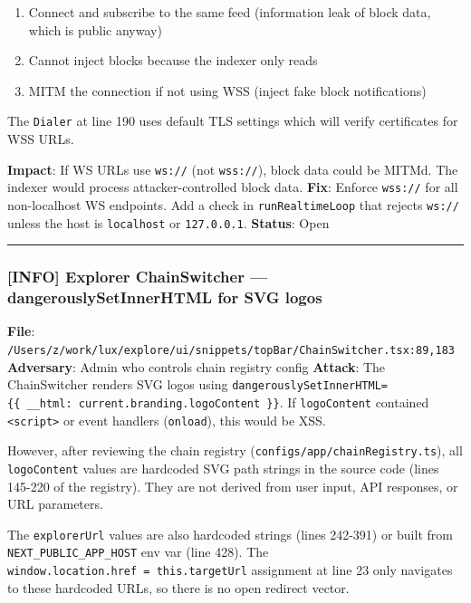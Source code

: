 \documentclass[
]{article}
\providecommand{\tightlist}{%
  \setlength{\itemsep}{0pt}\setlength{\parskip}{0pt}}
\begin{document}
\begin{enumerate}
\def\labelenumi{\arabic{enumi}.}
\tightlist
\item
  Connect and subscribe to the same feed (information leak of block
  data, which is public anyway)
\item
  Cannot inject blocks because the indexer only reads
\item
  MITM the connection if not using WSS (inject fake block notifications)
\end{enumerate}

The \texttt{Dialer} at line 190 uses default TLS settings which will
verify certificates for WSS URLs.

\textbf{Impact}: If WS URLs use \texttt{ws://} (not \texttt{wss://}),
block data could be MITM\textquotesingle d. The indexer would process
attacker-controlled block data. \textbf{Fix}: Enforce \texttt{wss://}
for all non-localhost WS endpoints. Add a check in
\texttt{runRealtimeLoop} that rejects \texttt{ws://} unless the host is
\texttt{localhost} or \texttt{127.0.0.1}. \textbf{Status}: Open

\begin{center}\rule{0.5\linewidth}{0.5pt}\end{center}

\subsubsection{{[}INFO{]} Explorer ChainSwitcher ---
dangerouslySetInnerHTML for SVG
logos}\label{info-explorer-chainswitcher--dangerouslysetinnerhtml-for-svg-logos}

\textbf{File}:
\texttt{/Users/z/work/lux/explore/ui/snippets/topBar/ChainSwitcher.tsx:89,183}
\textbf{Adversary}: Admin who controls chain registry config
\textbf{Attack}: The ChainSwitcher renders SVG logos using
\texttt{dangerouslySetInnerHTML=\{\{\ \_\_html:\ current.branding.logoContent\ \}\}}.
If \texttt{logoContent} contained
\texttt{\textless{}script\textgreater{}} or event handlers
(\texttt{onload}), this would be XSS.

However, after reviewing the chain registry
(\texttt{configs/app/chainRegistry.ts}), all \texttt{logoContent} values
are hardcoded SVG path strings in the source code (lines 145-220 of the
registry). They are not derived from user input, API responses, or URL
parameters.

The \texttt{explorerUrl} values are also hardcoded strings (lines
242-391) or built from \texttt{NEXT\_PUBLIC\_APP\_HOST} env var (line
428). The \texttt{window.location.href\ =\ this.targetUrl} assignment at
line 23 only navigates to these hardcoded URLs, so there is no open
redirect vector.
\end{document}
